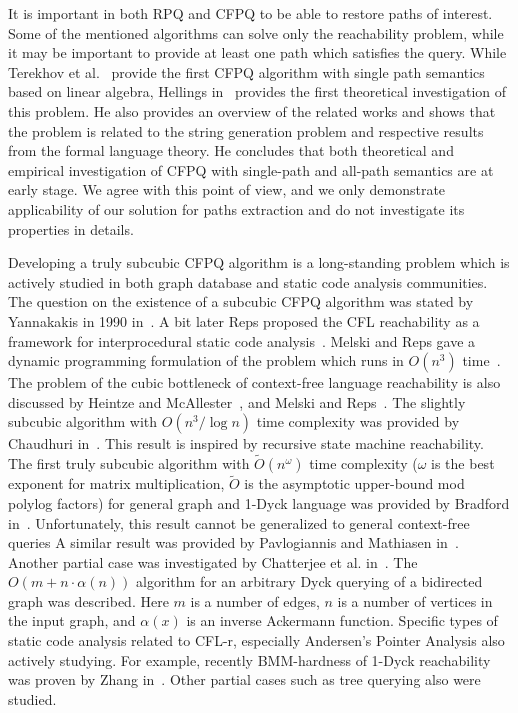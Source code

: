 It is important in both RPQ and CFPQ to be able to restore paths of interest.
Some of the mentioned algorithms can solve only the reachability problem, while it may be important to provide at least one path which satisfies the query.
While Terekhov et al.~\cite{10.1145/3398682.3399163} provide the first CFPQ algorithm with single path semantics based on linear algebra, Hellings in~\cite{HellSinglePath} provides the first theoretical investigation of this problem.
He also provides an overview of the related works and shows that the problem is related to the string generation problem and respective results from the formal language theory.
He concludes that both theoretical and empirical investigation of CFPQ with single-path and all-path semantics are at early stage.
We agree with this point of view, and we only demonstrate applicability of our solution for paths extraction and do not investigate its properties in details.

Developing a truly subcubic CFPQ algorithm is a long-standing problem which is actively studied in both graph database and static code analysis communities.
The question on the existence of a subcubic CFPQ algorithm was stated by Yannakakis in 1990 in~\cite{Yannakakis}.
A bit later Reps proposed the CFL reachability as a framework for interprocedural static code analysis~\cite{10.5555/271338.271343}.
Melski and Reps gave a dynamic programming formulation of the problem which runs in $O(n^3)$ time~\cite{10.1145/258993.259006}.
The problem of the cubic bottleneck of context-free language reachability is also discussed by Heintze and McAllester~\cite{10.5555/788019.788876}, and Melski and Reps~\cite{10.1145/258993.259006}.
The slightly subcubic algorithm with $O(n^3/\log{n})$ time complexity was provided by Chaudhuri in~\cite{10.1145/1328897.1328460}.
This result is inspired by recursive state machine reachability.
The first truly subcubic algorithm with $\widetilde{O}(n^\omega)$ time complexity ($\omega$ is the best exponent for matrix multiplication, $\widetilde{O}$ is the asymptotic upper-bound mod polylog factors) for general graph and 1-Dyck language was provided by Bradford in~\cite{Bradford2017EfficientEP}. Unfortunately, this result cannot be generalized to general context-free queries
A similar result was provided by Pavlogiannis and Mathiasen in~\cite{pavlogiannis2020finegrained}.
Another partial case was investigated by Chatterjee et al. in~\cite{10.1145/3158118}.
The $O(m + n \cdot \alpha(n))$ algorithm for an arbitrary Dyck querying of a bidirected graph was described. Here $m$ is a number of edges, $n$ is a number of vertices in the input graph, and $\alpha(x)$ is an inverse Ackermann function.
Specific types of static code analysis related to CFL-r, especially Andersen's Pointer Analysis also actively studying.
For example, recently BMM-hardness of 1-Dyck reachability was proven by Zhang in~\cite{zhang2020conditional}.
Other partial cases such as tree querying also were studied.

